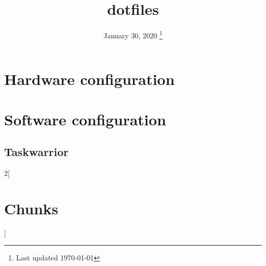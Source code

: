 \documentclass[a4paper,noglossary,titlepage,xelatex]{tufte-book}
\title{dotfiles}
\date{%
  January 30, 2020
  \thanks{Last updated \today}
}
\begin{document}
\frontmatter
\maketitle
\tableofcontents
\mainmatter

\newpage
\chapter{Hardware configuration}


\chapter{Software configuration}
\section{Taskwarrior}



\backmatter
\newpage
\begin{multicols}{2}[\chapter*{Chunks}]
  \nowebchunks
\end{multicols}






\newpage
\listoftodos[To-Do]
\end{document}
